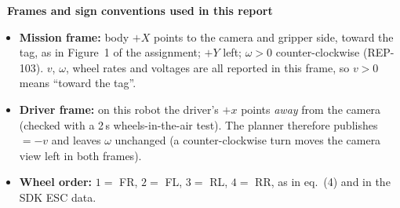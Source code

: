 \begin{notebox}
\small\textbf{\color{kfupmdark}\faCompass\ Frames and sign conventions used in this report}
\begin{itemize}
  \item \textbf{Mission frame:} body $+X$ points to the camera and gripper side, toward the tag, as in Figure~1 of the
        assignment; $+Y$ left; $\omega>0$ counter-clockwise (REP-103). $v$, $\omega$, wheel rates and voltages are
        all reported in this frame, so $v>0$ means ``toward the tag''.
  \item \textbf{Driver frame:} on this robot the driver's $+x$ points \emph{away} from the camera (checked with a
        2\,s wheels-in-the-air test). The planner therefore publishes  $=-v$ and leaves
        $\omega$ unchanged (a counter-clockwise turn moves the camera view left in both frames).
  \item \textbf{Wheel order:} $1=$ FR, $2=$ FL, $3=$ RL, $4=$ RR, as in eq.~(4) and in the SDK ESC data.
\end{itemize}
\end{notebox}
